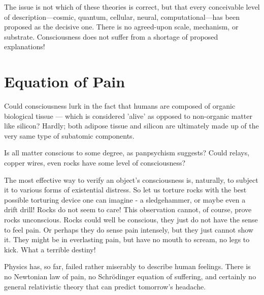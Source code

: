 The issue is not which of these theories is correct, but that every conceivable level of description—cosmic, quantum, cellular, neural, computational—has been proposed as the decisive one. There is no agreed-upon scale, mechanism, or substrate. Consciousness does not suffer from a shortage of proposed explanations!


\section{Equation of Pain}

Could consciousness lurk in the fact that humans are composed of organic biological tissue — which is considered 'alive' as opposed to non-organic matter like silicon? Hardly; both adipose tissue and silicon are ultimately made up of the very same type of subatomic components.

Is all matter conscious to some degree, as panpsychism suggests? Could relays, copper wires, even rocks have some level of consciousness?

The most effective way to verify an object's consciousness is, naturally, to subject it to various forms of existential distress.
So let us torture rocks with the best possible torturing device one can imagine - a sledgehammer, or maybe even a drift drill!
Rocks do not seem to care! This observation cannot, of course, prove rocks unconscious. Rocks could well be conscious, 
they just do not have the sense to feel pain. Or perhaps they do sense pain intensely, but they just cannot show it. 
They might be in everlasting pain, but have no mouth to scream, no legs to kick. What a terrible destiny!

Physics has, so far, failed rather miserably to describe human feelings. There is no Newtonian law of pain, no Schrödinger equation of suffering,
and certainly no general relativistic theory that can predict tomorrow’s headache.

